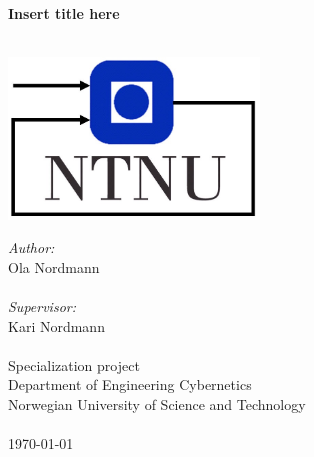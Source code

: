 \documentclass[pdftex,10pt,b5paper,twoside]{book}
\def\biblio{}
\begin{document}
\def\biblio{} %

\begin{titlepage}

        \begin{center}

            \vspace*{2cm}

   

            
            
            
        \HRule \\[0.4cm]
        { \huge \bfseries Insert title here}\\[0.4cm]
        \HRule \\[1.5cm]

   

            \vspace{1.0cm}

            

            \vfill

            \includegraphics[width=0.5\textwidth]{Figures/itk_ntnu.jpg}

            \vspace{0.8cm}
            
        \emph{Author:}\\
        Ola Nordmann\\\mbox{}\\
        \emph{Supervisor:}\\
        Kari Nordmann\\\mbox{}\\
        
        

            Specialization project\\
            Department of Engineering Cybernetics\\
            
            

            Norwegian University of Science and Technology\\\mbox{}\\ 

            

            \today
        
        \end{center}
    \end{titlepage}
\end{document}
